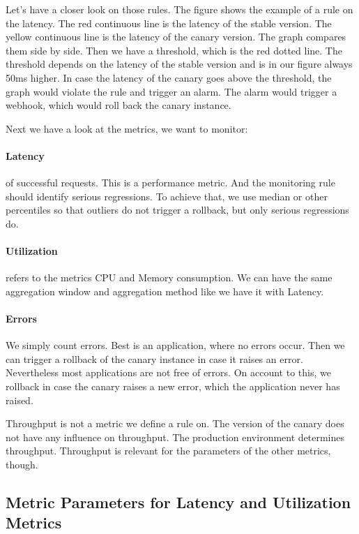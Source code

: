 Let's have a closer look on those rules. The figure shows the example of a rule on the
latency. The red continuous line is the latency of the stable version. The yellow
continuous line is the latency of the canary version. The graph compares them side by
side. Then we have a threshold, which is the red dotted line. The threshold depends on the
latency of the stable version and is in our figure always 50ms higher. In case the latency
of the canary goes above the threshold, the graph would violate the rule and trigger an
alarm. The alarm would trigger a webhook, which would roll back the canary instance.

Next we have a look at the metrics, we want to monitor:

\paragraph{Latency} of successful requests. This is a performance metric. And the
monitoring rule should identify serious regressions. To achieve that, we use median or
other percentiles so that outliers do not trigger a rollback, but only serious
regressions do.

\paragraph{Utilization} refers to the metrics CPU and Memory consumption. We can have the
same aggregation window and aggregation method like we have it with Latency.

\paragraph{Errors} We simply count errors. Best is an application, where no errors
occur. Then we can trigger a rollback of the canary instance in case it raises an
error. Nevertheless most applications are not free of errors. On account to this, we
rollback in case the canary raises a new error, which the application never has raised.

Throughput is not a metric we define a rule on. The version of the canary does not have
any influence on throughput. The production environment determines throughput. Throughput
is relevant for the parameters of the other metrics, though.

\subsection{Metric Parameters for Latency and Utilization Metrics}

